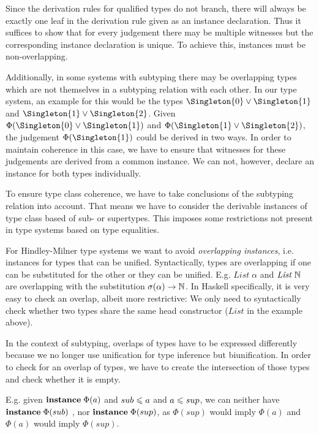 Since the derivation rules for qualified types do not branch, there will always be exactly one leaf in the derivation rule given as an instance declaration.
Thus it suffices to show that for every judgement there  may be multiple witnesses but the corresponding instance declaration is unique.
To achieve this, instances must be non-overlapping.

Additionally, in some systems with subtyping there may be overlapping types which are not themselves in a subtyping relation with each other.
In our type system, an example for this would be the types $\Singleton{0} \join \Singleton{1}$ and $\Singleton{1} \join \Singleton{2}$.
Given $\Phi(\Singleton{0} \join \Singleton{1})$ and $\Phi(\Singleton{1} \join \Singleton{2})$, the judgement $\Phi(\Singleton{1})$ could be derived in two ways.
In order to maintain coherence in this case, we have to ensure that witnesses for these judgements are derived from a common instance.
We can not, however, declare an instance for both types individually.

To ensure type class coherence, we have to take conclusions of the subtyping relation into account.
That means we have to consider the derivable instances of type class based of sub- or supertypes.
This imposes some restrictions not present in type systems based on type equalities.

For Hindley-Milner type systems we want to avoid \emph{overlapping instances}, i.e. instances for types that can be unified. \cite{peytonjones1997type}
Syntactically, types are overlapping if one can be substituted for the other or they can be unified.
E.g. $\mathit{List} \; \alpha$ and $\mathit{List} \; \mathbb{N}$ are overlapping with the substitution $\sigma(\alpha) \to \mathbb{N}$.
In Haskell specifically, it is very easy to check an overlap, albeit more restrictive: We only need to syntactically check whether two types share the same head constructor ($\mathit{List}$ in the example above).

In the context of subtyping, overlaps of types have to be expressed differently because we no longer use unification for type inference but biunification.
In order to check for an overlap of types, we have to create the intersection of those types and check whether it is empty.

E.g. given ${\bf instance} \; \Phi(a)$ and $sub \leqslant a$ and $a \leqslant sup$, we can neither have ${\bf instance} \; \Phi(sub)$ , nor ${\bf instance} \; \Phi(sup)$,
as $\Phi(sup)$ would imply $\Phi(a)$ and $\Phi(a)$ would imply $\Phi(sup)$.

